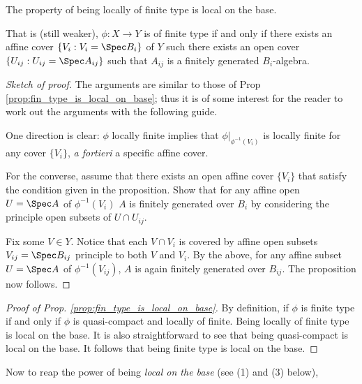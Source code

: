 \begin{prop}
The property of being locally of finite type is local on the base.

That is (still weaker), $\phi: X \to Y$ is of finite type if and 
only if there exists an affine cover $\{V_i : V_i = \Spec B_i\}$ 
of $Y$ such there exists an open cover $\{U_{ij} : U_{ij} = \Spec 
A_{ij}\}$ such that $A_{ij}$ is a finitely generated 
$B_i$-algebra.
\end{prop}
\begin{proof}[Sketch of proof]
The arguments are similar to those of Prop 
\ref{prop:fin_type_is_local_on_base}; thus it is of some interest
for the reader to work out the arguments with the following guide.

One direction is clear: $\phi$ locally finite implies that 
$\phi|_{\phi^{-1}(V_i)}$ is locally finite for any cover $\{V_i\}$,
\emph{a fortieri} a specific affine cover.

For the converse, assume that there exists an open affine cover 
$\{V_i\}$ that satisfy the condition given in the proposition.
Show that for any affine open $U = \Spec A$ of $\phi^{-1}(V_i)$
$A$ is finitely generated over $B_i$ by considering the principle
open subsets of $U \cap U_{ij}$.

Fix some $V \in Y$. Notice that each $V \cap V_i$ is covered by
affine open subsets $V_{ij} = \Spec B_{ij}$ principle to both $V$ 
and $V_i$. By the above, for any affine subset $U = \Spec A$ of 
$\phi^{-1}(V_{ij})$, $A$ is again finitely generated over $B_{ij}$.
The proposition now follows.
\end{proof}

\begin{proof}[Proof of Prop. \ref{prop:fin_type_is_local_on_base}]
By definition, if $\phi$ is finite type if and only if $\phi$ is 
quasi-compact and locally of finite. Being locally of finite type
is local on the base. It is also straightforward to see that being 
quasi-compact is local on the base. It follows that being finite
type is local on the base.
\end{proof}

Now to reap the power of being \emph{local on the base} (see 
(1) and (3) below),

